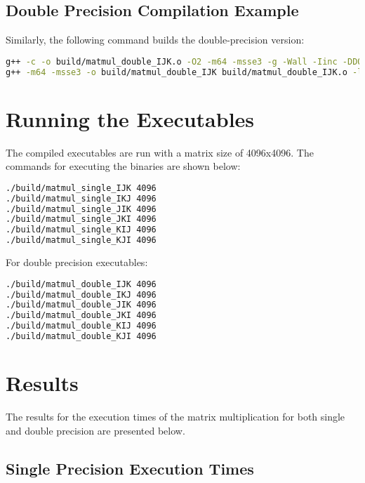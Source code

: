 \documentclass[12pt]{article}
\begin{document}
\subsection{Double Precision Compilation Example}

Similarly, the following command builds the double-precision version:

\begin{lstlisting}[language=bash]
g++ -c -o build/matmul_double_IJK.o -O2 -m64 -msse3 -g -Wall -Iinc -DDOUBLE -DORDER_IJK src/matmul.cpp
g++ -m64 -msse3 -o build/matmul_double_IJK build/matmul_double_IJK.o -lrt
\end{lstlisting}

\section{Running the Executables}

The compiled executables are run with a matrix size of 4096x4096. The commands for executing the binaries are shown below:

\begin{lstlisting}[language=bash, caption=Run Single Precision Executables]
./build/matmul_single_IJK 4096
./build/matmul_single_IKJ 4096
./build/matmul_single_JIK 4096
./build/matmul_single_JKI 4096
./build/matmul_single_KIJ 4096
./build/matmul_single_KJI 4096
\end{lstlisting}

For double precision executables:

\begin{lstlisting}[language=bash, caption=Run Double Precision Executables]
./build/matmul_double_IJK 4096
./build/matmul_double_IKJ 4096
./build/matmul_double_JIK 4096
./build/matmul_double_JKI 4096
./build/matmul_double_KIJ 4096
./build/matmul_double_KJI 4096
\end{lstlisting}

\section{Results}

The results for the execution times of the matrix multiplication for both single and double precision are presented below.

\subsection{Single Precision Execution Times}
\end{document}
